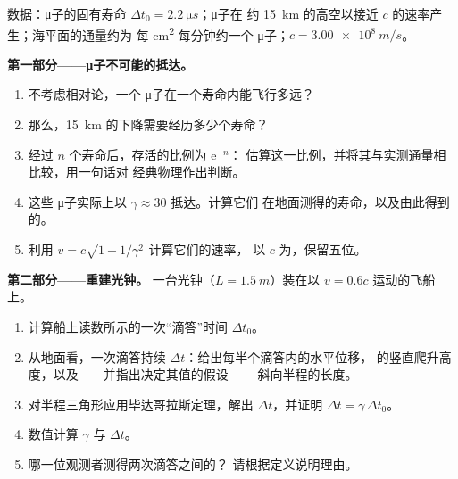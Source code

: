 \begin{problem}
\label{pb:g12:special-relativity:1}
数据：μ子的固有寿命 $\Delta t_0 = \qty{2.2}{\micro s}$；μ子在
约 \qty{15}{km} 的高空以接近 $c$ 的速率产生；海平面的通量约为
每 \unit{cm^2} 每分钟约一个 μ子；$c = \qty{3.00e8}{m/s}$。

\medskip
\noindent\textbf{第一部分——μ子不可能的抵达。}
\begin{enumerate}
  \item 不考虑相对论，一个 μ子在一个寿命内能飞行多远？
  \item 那么，\qty{15}{km} 的下降需要经历多少个寿命？
  \item 经过 $n$ 个寿命后，存活的比例为 $\mathrm{e}^{-n}$：
        估算这一比例，并将其与实测通量相比较，用一句话对
        经典物理作出判断。
  \item 这些 μ子实际上以 $\gamma \approx 30$ 抵达。计算它们
        在地面测得的寿命，以及由此得到的。
  \item 利用 $v = c\sqrt{1 - 1/\gamma^2}$ 计算它们的速率，
        以 $c$ 为，保留五位。
\end{enumerate}

\medskip
\noindent\textbf{第二部分——重建光钟。}
一台光钟（$L = \qty{1.5}{m}$）装在以 $v = 0.6c$ 运动的飞船上。
\begin{enumerate}[resume]
  \item 计算船上读数所示的一次“滴答”时间 $\Delta t_0$。
  \item 从地面看，一次滴答持续 $\Delta t$：给出每半个滴答内的水平位移，
        的竖直爬升高度，以及——并指出决定其值的假设——
        斜向半程的长度。
  \item 对半程三角形应用毕达哥拉斯定理，解出
        $\Delta t$，并证明 $\Delta t = \gamma\,\Delta t_0$。
  \item 数值计算 $\gamma$ 与 $\Delta t$。
  \item 哪一位观测者测得两次滴答之间的？
        请根据定义说明理由。
\end{enumerate}


\end{problem}
